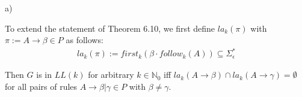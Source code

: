 a)

To extend the statement of Theorem 6.10, we first define $la_k(\pi)$ with $\pi := A \rightarrow \beta \in P$ as follows:
\begin{equation*}\begin{split}
la_k(\pi) := first_k(\beta \cdot follow_k(A)) \subseteq \Sigma_{\epsilon}^*
\end{split}\end{equation*}

Then $G$ is in $LL(k)$ for arbitrary $k \in \mathbb{N}_0$ iff $la_k(A \rightarrow \beta) \cap la_k(A \rightarrow \gamma) = \emptyset$ for all pairs of rules $A \rightarrow \beta | \gamma \in P$ with $\beta \neq \gamma$.